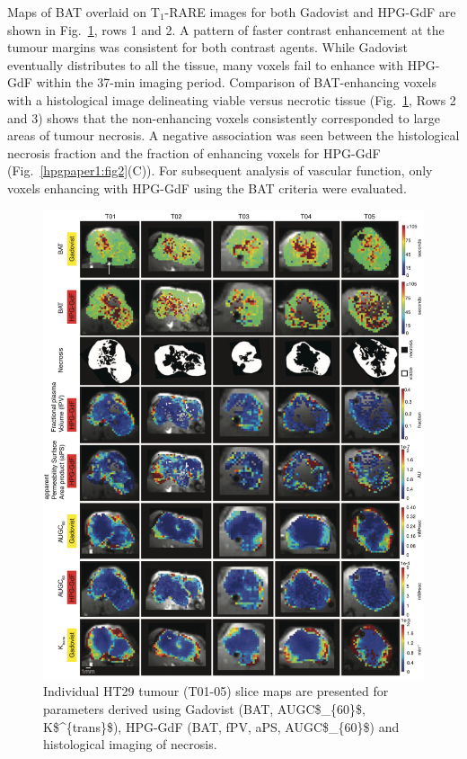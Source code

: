 Maps of \acs{BAT} overlaid on T$_1$-RARE images for both Gadovist and \acs{HPG-GdF} are shown in Fig.~\ref{hpgpaper1:fig4}, rows 1 and 2.
A pattern of faster contrast enhancement at the tumour margins was consistent for both contrast agents.
While Gadovist eventually distributes to all the tissue, many voxels fail to enhance with \acs{HPG-GdF} within the 37-min imaging period.
Comparison of \acs{BAT}-enhancing voxels with a histological image delineating viable versus necrotic tissue (Fig.~\ref{hpgpaper1:fig4}, Rows 2 and 3) shows that the non-enhancing voxels consistently corresponded to large areas of tumour necrosis.
A negative association was seen between the histological necrosis fraction and the fraction of enhancing voxels for \acs{HPG-GdF} (Fig.~\ref{hpgpaper1:fig2}(C)).
For subsequent analysis of vascular function, only voxels enhancing with \acs{HPG-GdF} using the \acs{BAT} criteria were evaluated.

\begin{figure}[htbp]
 \includegraphics[width=\textwidth]{hpg/hpg-paper1-images/hpg_fig4-ht29.png}
 \caption{Individual HT29 tumour (T01-05) slice maps are presented for parameters derived using Gadovist (\acs{BAT}, \acs{AUGC$_{60}$}, \acs{K$^{trans}$}), \acs{HPG-GdF} (\acs{BAT}, \acs{fPV}, \acs{aPS}, \acs{AUGC$_{60}$}) and histological imaging of necrosis.}
 \label{hpgpaper1:fig4}
\end{figure}

